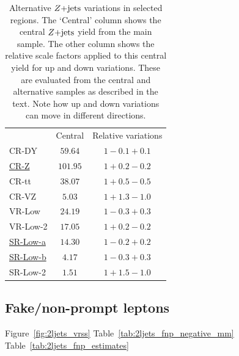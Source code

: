 \begin{table}[tp]
\centering
\begin{tabular}{lcc}
& Central
& Relative variations
\\[0.5em]
CR-DY
& $59.64$
& $1-0.1+0.1$
\\[0.2em]
\underline{CR-Z}
& $101.95$
& $1+0.2-0.2$
\\[0.2em]
CR-tt
& $38.07$
& $1+0.5-0.5$
\\[0.2em]
CR-VZ
& $5.03$
& $1+1.3-1.0$
\\[0.5em]
VR-Low
& $24.19$
& $1-0.3+0.3$
\\[0.2em]
VR-Low-2
& $17.05$
& $1+0.2-0.2$
\\[0.5em]
\underline{SR-Low-a}
& $14.30$
& $1-0.2+0.2$
\\[0.2em]
\underline{SR-Low-b}
& $4.17$
& $1-0.3+0.3$
\\[0.2em]
SR-Low-2
& $1.51$
& $1+1.5-1.0$
\\[0.2em]
\end{tabular}
\caption[%
Alternative $\zjets$ variations in selected regions
]{%
Alternative $\zjets$ variations in selected regions.
The `Central' column shows the central $\zjets$ yield from the main sample.
The other column shows the relative scale factors applied to this central yield
for up and down variations.
These are evaluated from the central and alternative samples as described in
the text.
Note how up and down variations can move in different directions.
}
\label{tab:2ljets_zjets_alt}
\end{table}


\subsection{Fake/non-prompt leptons}
\label{sec:2ljets_mm_fakes}

Figure~\ref{fig:2ljets_vrss}
Table~\ref{tab:2ljets_fnp_negative_mm}
Table~\ref{tab:2ljets_fnp_estimates}

